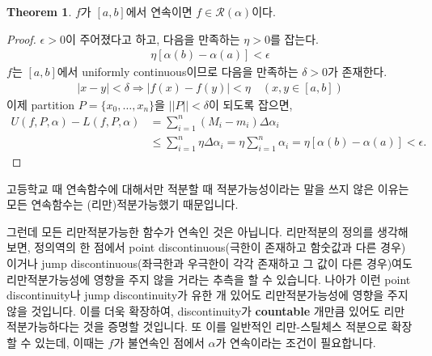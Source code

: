 \documentclass[12pt]{article}
\theoremstyle{definition}
\newtheorem{thm}{Theorem}[section]
\def\eps{\epsilon}
\def\calR{\mathcal{R}}
\newcommand{\abs}[1]{\left\vert#1\right\vert}
\newcommand{\norm}[1]{\left\vert\left\vert#1\right\vert\right\vert}
\begin{document}
\begin{thm}
	\(f\)가 \([a, b]\)에서 연속이면 \(f \in \calR(\alpha)\)이다.
\end{thm}
\begin{proof}
	\(\eps > 0\)이 주어졌다고 하고, 다음을 만족하는 \(\eta > 0\)를 잡는다.
	\begin{gather*}
		\eta[\alpha(b) - \alpha(a)] < \eps
	\end{gather*}
	\(f\)는 \([a, b]\)에서 uniformly continuous이므로 다음을 만족하는 \(\delta > 0\)가 존재한다.
	\begin{gather*}
		\abs{x - y} < \delta \Longrightarrow \abs{f(x) - f(y)} < \eta \quad (x, y \in [a, b])
	\end{gather*}
	이제 partition \(P = \{x_0, \ldots, x_n\}\)을 \(\norm{P} < \delta\)이 되도록 잡으면,
	\begin{align*}
		U(f, P, \alpha) - L(f, P, \alpha) &= \sum_{i=1}^n (M_i - m_i)\Delta\alpha_i\\
		&\le \sum_{i=1}^n \eta\Delta\alpha_i = \eta \sum_{i=1}^n \alpha_i = \eta[\alpha(b) - \alpha(a)] < \eps.
	\end{align*}
\end{proof}

고등학교 때 연속함수에 대해서만 적분할 때 적분가능성이라는 말을 쓰지 않은 이유는 모든 연속함수는 (리만)적분가능했기 때문입니다.

그런데 모든 리만적분가능한 함수가 연속인 것은 아닙니다. 리만적분의 정의를 생각해 보면, 정의역의 한 점에서 point discontinuous(극한이 존재하고 함숫값과 다른 경우)이거나 jump discontinuous(좌극한과 우극한이 각각 존재하고 그 값이 다른 경우)여도 리만적분가능성에 영향을 주지 않을 거라는 추측을 할 수 있습니다. 나아가 이런 point discontinuity나 jump discontinuity가 유한 개 있어도 리만적분가능성에 영향을 주지 않을 것입니다. 이를 더욱 확장하여, discontinuity가 \textbf{countable} 개만큼 있어도 리만적분가능하다는 것을 증명할 것입니다. 또 이를 일반적인 리만-스틸체스 적분으로 확장할 수 있는데, 이때는 \(f\)가 불연속인 점에서 \(\alpha\)가 연속이라는 조건이 필요합니다.
\end{document}
